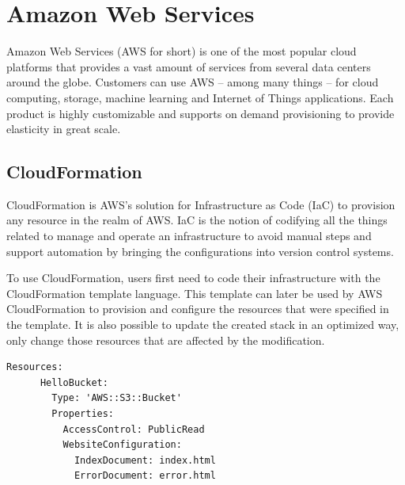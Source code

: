\section{Amazon Web Services}

Amazon Web Services (AWS for short) is one of the most popular cloud platforms that provides a vast amount of services from several data centers around the globe. Customers can use AWS -- among many things -- for cloud computing, storage, machine learning and Internet of Things applications. Each product is highly customizable and supports on demand provisioning to provide elasticity in great scale. \cite{AWSWhatIs}
\subsection{CloudFormation} \label{cloudformation}

CloudFormation is AWS's solution for Infrastructure as Code (IaC) to provision any resource in the realm of AWS. IaC is the notion of codifying all the things related to manage and operate an infrastructure to avoid manual steps and support automation by bringing the configurations into version control systems.

To use CloudFormation, users first need to code their infrastructure with the CloudFormation template language. This template can later be used by AWS CloudFormation to provision and configure the resources that were specified in the template. It is also possible to update the created stack in an optimized way, only change those resources that are affected by the modification.

\vspace{0.5cm}
\begin{minipage}{\linewidth}
	\begin{lstlisting}[caption={Example CloudFormation template of an S3 bucket \cite{AWSCloudFormationExample}}, label={lst:aws-cf-bucket}]
	Resources:
	  HelloBucket:
	    Type: 'AWS::S3::Bucket'
	    Properties:
	      AccessControl: PublicRead
	      WebsiteConfiguration:
	        IndexDocument: index.html
	        ErrorDocument: error.html
	\end{lstlisting}
\end{minipage}

